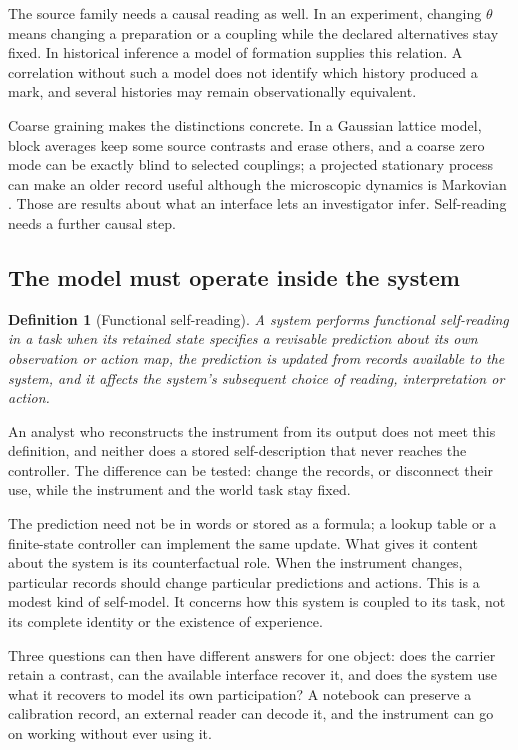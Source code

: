 \documentclass[11pt,a4paper]{article}
\newtheorem{definition}{Definition}[section]
\begin{document}
The source family needs a causal reading as well. In an experiment, changing $\theta$ means changing a preparation or a coupling while the declared alternatives stay fixed. In historical inference a model of formation supplies this relation. A correlation without such a model does not identify which history produced a mark, and several histories may remain observationally equivalent.

Coarse graining makes the distinctions concrete. In a Gaussian lattice model, block averages keep some source contrasts and erase others, and a coarse zero mode can be exactly blind to selected couplings; a projected stationary process can make an older record useful although the microscopic dynamics is Markovian \cite{ImprintRG}. Those are results about what an interface lets an investigator infer. Self-reading needs a further causal step.

\subsection{The model must operate inside the system}

\begin{definition}[Functional self-reading]\label{def:selfreading}
A system performs functional self-reading in a task when its retained state specifies a revisable prediction about its own observation or action map, the prediction is updated from records available to the system, and it affects the system's subsequent choice of reading, interpretation or action.
\end{definition}

An analyst who reconstructs the instrument from its output does not meet this definition, and neither does a stored self-description that never reaches the controller. The difference can be tested: change the records, or disconnect their use, while the instrument and the world task stay fixed.

The prediction need not be in words or stored as a formula; a lookup table or a finite-state controller can implement the same update. What gives it content about the system is its counterfactual role. When the instrument changes, particular records should change particular predictions and actions. This is a modest kind of self-model. It concerns how this system is coupled to its task, not its complete identity or the existence of experience.

Three questions can then have different answers for one object: does the carrier retain a contrast, can the available interface recover it, and does the system use what it recovers to model its own participation? A notebook can preserve a calibration record, an external reader can decode it, and the instrument can go on working without ever using it.
\end{document}
